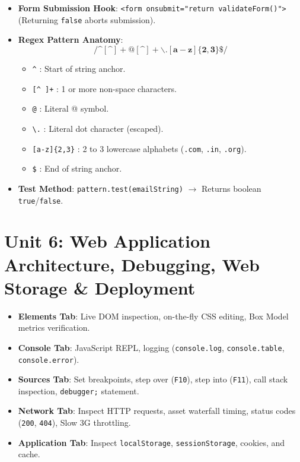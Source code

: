 \documentclass[a4paper,11pt]{article}
\begin{document}
\begin{examalert}
\begin{itemize}[leftmargin=*]
    \item \textbf{Form Submission Hook}: \texttt{<form onsubmit="return validateForm()">} (Returning \texttt{false} aborts submission).
    \item \textbf{Regex Pattern Anatomy}:
    $$\mathbf{/\text{\textasciicircum}[ \text{\textasciicircum} ]+@[ \text{\textasciicircum} ]+\backslash.[a-z]\{2,3\}\$/}$$
    \begin{itemize}
        \item \texttt{\textasciicircum} : Start of string anchor.
        \item \texttt{[\textasciicircum\ ]+} : 1 or more non-space characters.
        \item \texttt{@} : Literal @ symbol.
        \item \texttt{\textbackslash.} : Literal dot character (escaped).
        \item \texttt{[a-z]\{2,3\}} : 2 to 3 lowercase alphabets (\texttt{.com}, \texttt{.in}, \texttt{.org}).
        \item \texttt{\$} : End of string anchor.
    \end{itemize}
    \item \textbf{Test Method}: \texttt{pattern.test(emailString)} $\to$ Returns boolean \texttt{true}/\texttt{false}.
\end{itemize}
\end{examalert}

\newpage
\section{Unit 6: Web Application Architecture, Debugging, Web Storage \& Deployment}

\begin{conceptbox}
\begin{itemize}[leftmargin=*]
    \item \textbf{Elements Tab}: Live DOM inspection, on-the-fly CSS editing, Box Model metrics verification.
    \item \textbf{Console Tab}: JavaScript REPL, logging (\texttt{console.log}, \texttt{console.table}, \texttt{console.error}).
    \item \textbf{Sources Tab}: Set breakpoints, step over (\texttt{F10}), step into (\texttt{F11}), call stack inspection, \texttt{debugger;} statement.
    \item \textbf{Network Tab}: Inspect HTTP requests, asset waterfall timing, status codes (\texttt{200}, \texttt{404}), Slow 3G throttling.
    \item \textbf{Application Tab}: Inspect \texttt{localStorage}, \texttt{sessionStorage}, cookies, and cache.
\end{itemize}
\end{conceptbox}
\end{document}
